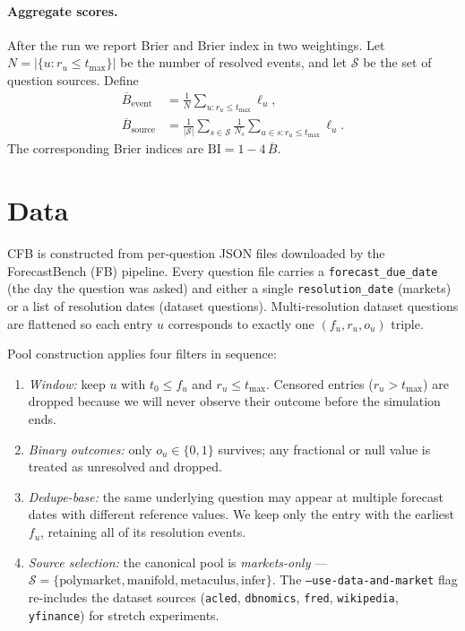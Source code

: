\documentclass[11pt]{article}
\begin{document}
\paragraph{Aggregate scores.}
After the run we report Brier and Brier index in two weightings. Let
$N = |\{u : r_u \le t_{\max}\}|$ be the number of resolved events, and
let $\mathcal{S}$ be the set of question sources. Define
\begin{align}
  \overline{B}_{\text{event}}
    &= \tfrac{1}{N}\textstyle\sum_{u : r_u \le t_{\max}} \ell_u, \\
  \overline{B}_{\text{source}}
    &= \tfrac{1}{|\mathcal{S}|}\textstyle\sum_{s \in \mathcal{S}}
       \tfrac{1}{N_s}\textstyle\sum_{u \in s : r_u \le t_{\max}} \ell_u.
\end{align}
The corresponding Brier indices are $\mathrm{BI} = 1 - 4\,\overline{B}$.

\section{Data}
\label{sec:data}

CFB is constructed from per-question JSON files downloaded by the
ForecastBench (FB) pipeline. Every question file carries a
\texttt{forecast\_due\_date} (the day the question was asked) and either
a single \texttt{resolution\_date} (markets) or a list of resolution dates
(dataset questions). Multi-resolution dataset questions are flattened so
each entry $u$ corresponds to exactly one $(f_u, r_u, o_u)$ triple.

Pool construction applies four filters in sequence:
\begin{enumerate}
  \item \emph{Window:} keep $u$ with $t_0 \le f_u$ and $r_u \le t_{\max}$.
        Censored entries ($r_u > t_{\max}$) are dropped because we will
        never observe their outcome before the simulation ends.
  \item \emph{Binary outcomes:} only $o_u \in \{0, 1\}$ survives; any
        fractional or null value is treated as unresolved and dropped.
  \item \emph{Dedupe-base:} the same underlying question may appear at
        multiple forecast dates with different reference values. We keep
        only the entry with the earliest $f_u$, retaining all of its
        resolution events.
  \item \emph{Source selection:} the canonical pool is
        \emph{markets-only} ---
        $\mathcal{S} = \{\text{polymarket}, \text{manifold},
                         \text{metaculus}, \text{infer}\}$. The
        \texttt{--use-data-and-market} flag re-includes the dataset
        sources (\texttt{acled}, \texttt{dbnomics}, \texttt{fred},
        \texttt{wikipedia}, \texttt{yfinance}) for stretch experiments.
\end{enumerate}
\end{document}

